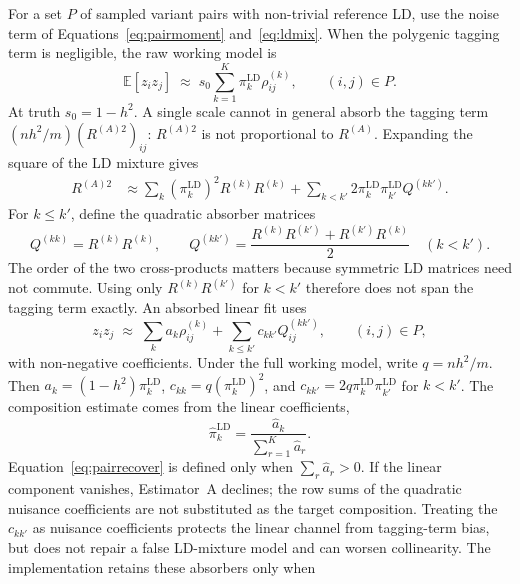 \documentclass[11pt,a4paper]{article}
\newcommand{\Rho}{\rho}
\begin{document}
For a set $P$ of sampled variant pairs with non-trivial reference LD, use
the noise term of Equations~\eqref{eq:pairmoment} and~\eqref{eq:ldmix}.
When the polygenic tagging term is negligible, the raw working model is
\begin{equation}\label{eq:paireq}
  \mathbb{E}\!\left[ z_i z_j \right]
  \;\approx\; s_0 \sum_{k=1}^{K} \pi^{\mathrm{LD}}_k
                        \Rho^{(k)}_{ij},
  \qquad (i,j) \in P .
\end{equation}
At truth $s_0=1-h^2$. A single scale cannot in general absorb the tagging
term $(nh^2/m)(R^{(A)2})_{ij}$: $R^{(A)2}$ is not proportional to
$R^{(A)}$. Expanding the square of the LD mixture gives
\begin{align}\label{eq:qexpand}
  R^{(A)2}
  &\approx \sum_k (\pi^{\mathrm{LD}}_k)^2 R^{(k)}R^{(k)}
  + \sum_{k<k'}2\pi^{\mathrm{LD}}_k\pi^{\mathrm{LD}}_{k'}Q^{(kk')}.
\end{align}
For $k\leq k'$, define the quadratic absorber matrices
\begin{equation}\label{eq:qdef}
  Q^{(kk)}=R^{(k)}R^{(k)}, \qquad
  Q^{(kk')}=\frac{R^{(k)}R^{(k')}+R^{(k')}R^{(k)}}{2}
  \quad (k<k').
\end{equation}
The order of the two cross-products matters because symmetric LD matrices
need not commute. Using only $R^{(k)}R^{(k')}$ for $k<k'$ therefore does not
span the tagging term exactly. An absorbed linear fit uses
\begin{equation}\label{eq:pairls}
  z_i z_j \;\approx\;
  \sum_k a_k\Rho^{(k)}_{ij}
  + \sum_{k\leq k'}c_{kk'}Q^{(kk')}_{ij},
  \qquad (i,j)\in P,
\end{equation}
with non-negative coefficients. Under the full working model, write
$q=nh^2/m$. Then $a_k=(1-h^2)\pi^{\mathrm{LD}}_k$,
$c_{kk}=q(\pi^{\mathrm{LD}}_k)^2$, and
$c_{kk'}=2q\pi^{\mathrm{LD}}_k\pi^{\mathrm{LD}}_{k'}$ for $k<k'$.
The composition estimate comes from the linear coefficients,
\begin{equation}\label{eq:pairrecover}
  \hat\pi^{\mathrm{LD}}_k
  = \frac{\hat a_k}{\sum_{r=1}^{K}\hat a_r}.
\end{equation}
Equation~\eqref{eq:pairrecover} is defined only when
$\sum_r\hat a_r>0$. If the linear component vanishes, Estimator~A declines;
the row sums of the quadratic nuisance coefficients are not substituted as
the target composition.
Treating the $c_{kk'}$ as nuisance coefficients protects the linear channel
from tagging-term bias, but does not repair a false LD-mixture model and can
worsen collinearity. The implementation retains these absorbers only when
\end{document}
